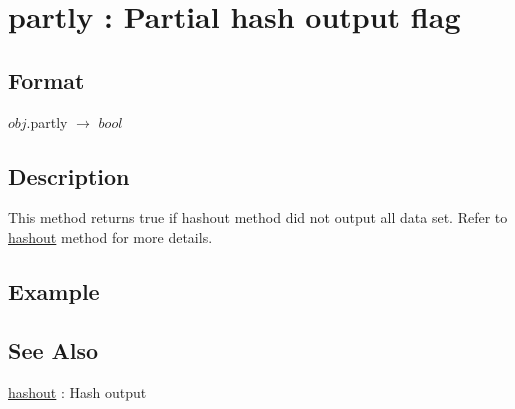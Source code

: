 
\section{partly : Partial hash output flag\label{sect:partly}}
\subsection*{Format}
$obj$.partly $\rightarrow$ $bool$

\subsection*{Description}
This method returns true if hashout method did not output all data set. 
Refer to \hyperref[sect:hashout]{hashout} method for more details. 

\subsection*{Example}


\subsection*{See Also}
\hyperref[sect:hashout]{hashout} : Hash output 


